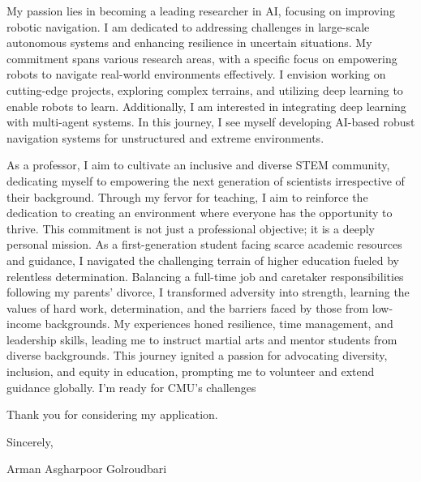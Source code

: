 \documentclass[12pt]{article}
\begin{document}
My passion lies in becoming a leading researcher in AI, focusing on improving robotic navigation. I am dedicated to addressing challenges in large-scale autonomous systems and enhancing resilience in uncertain situations. My commitment spans various research areas, with a specific focus on empowering robots to navigate real-world environments effectively. I envision working on cutting-edge projects, exploring complex terrains, and utilizing deep learning to enable robots to learn. Additionally, I am interested in integrating deep learning with multi-agent systems. In this journey, I see myself developing AI-based robust navigation systems for unstructured and extreme environments.



As a professor, I aim to cultivate an inclusive and diverse STEM community, dedicating myself to empowering the next generation of scientists irrespective of their background. Through my fervor for teaching, I aim to reinforce the dedication to creating an environment where everyone has the opportunity to thrive. This commitment is not just a professional objective; it is a deeply personal mission. As a first-generation student facing scarce academic resources and guidance, I navigated the challenging terrain of higher education fueled by relentless determination. Balancing a full-time job and caretaker responsibilities following my parents' divorce, I transformed adversity into strength, learning the values of hard work, determination, and the barriers faced by those from low-income backgrounds. My experiences honed resilience, time management, and leadership skills, leading me to instruct martial arts and mentor students from diverse backgrounds. This journey ignited a passion for advocating diversity, inclusion, and equity in education, prompting me to volunteer and extend guidance globally.  I’m ready for CMU’s challenges

\vspace{0.05cm}
Thank you for considering my application.\vspace{-0.1cm}

Sincerely, \vspace{-0.1cm}

Arman Asgharpoor Golroudbari
\end{document}
